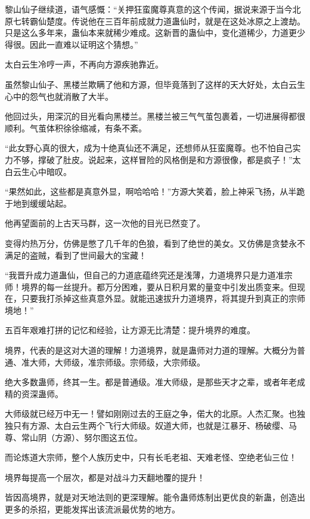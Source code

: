 
\begin{this_body}



黎山仙子继续道，语气感慨：“关押狂蛮魔尊真意的这个传闻，据说来源于当今北原七转霸仙楚度。传说他在三百年前成就力道蛊仙时，就是在这处冰原之上渡劫。只是这么多年来，蛊仙本来就稀少难成。这新晋的蛊仙中，变化道稀少，力道更少得很。因此一直难以证明这个猜想。”

太白云生冷哼一声，不再向方源疾驰靠近。

虽然黎山仙子、黑楼兰欺瞒了他和方源，但毕竟落到了这样的天大好处，太白云生心中的怨气也就消散了大半。

他回过头，用深沉的目光看向黑楼兰。黑楼兰被三气气茧包裹着，一切进展得都很顺利。气茧体积徐徐缩减，有条不紊。

“此女野心真的很大，成为十绝真仙还不满足，还想师从狂蛮魔尊。也不怕自己实力不够，撑破了肚皮。说起来，这样冒险的风格倒是和方源很像，都是疯子！”太白云生心中暗叹。

“果然如此，这些都是真意外显，啊哈哈哈！”方源大笑着，脸上神采飞扬，从半跪于地到缓缓站起。

他再望面前的上古天马群，这一次他的目光已然变了。

变得灼热万分，仿佛是憋了几千年的色狼，看到了绝世的美女。又仿佛是贪婪永不满足的盗贼，看到了世间最大的宝藏！

“我晋升成力道蛊仙，但自己的力道底蕴终究还是浅薄，力道境界只是力道准宗师！境界的每一丝提升。都万分困难，要从日积月累的量变中引发出质变来。但现在，只要我打杀掉这些真意外显。就能迅速拔升力道境界，将其提升到真正的宗师境地！”

五百年艰难打拼的记忆和经验，让方源无比清楚：提升境界的难度。

境界，代表的是这对大道的理解！力道境界，就是蛊师对力道的理解。大概分为普通、准大师，大师级，准宗师级。宗师级，大宗师级。

绝大多数蛊师，终其一生。都是普通级。准大师级，是那些天才之辈，或者年老成精的资深蛊师。

大师级就已经万中无一！譬如刚刚过去的王庭之争，偌大的北原。人杰汇聚。也独独只有方源、太白云生两个飞行大师级。奴道大师，也就是江暴牙、杨破缨、马尊、常山阴（方源）、努尔图这五位。

而论炼道大宗师，整个人族历史中，只有长毛老祖、天难老怪、空绝老仙三位！

境界每提高一个层次，都是对战斗力天翻地覆的提升！

皆因高境界，就是对天地法则的更深理解。能令蛊师炼制出更优良的新蛊，创造出更多的杀招，更能发挥出该流派最优势的地方。


\end{this_body}
